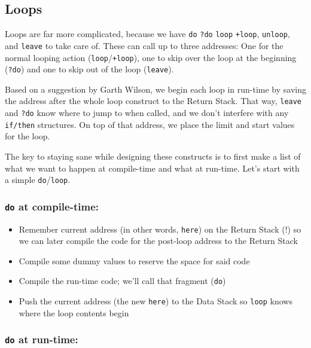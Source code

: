 \begin{enumerate}
{{\subsection{Loops} 

Loops are far more complicated, because we have \texttt{do} \texttt{?do}
\texttt{loop} \texttt{+loop}, \texttt{unloop}, and \texttt{leave} to take care
of. These can call up to three addresses: One for the normal looping action
(\texttt{loop}/\texttt{+loop}), one to skip over the loop at the beginning
(\texttt{?do}) and one to skip out of the loop (\texttt{leave}). 

Based on a suggestion by Garth Wilson, we begin each loop in run-time by saving
the address after the whole loop construct to the Return Stack. That way,
\texttt{leave} and \texttt{?do} know where to jump to when called, and we don't
interfere with any \texttt{if/then} structures. On top of that address, we place
the limit and start values for the loop. 

The key to staying sane while designing these constructs is to first make
a list of what we want to happen at compile-time and what at run-time. Let's
start with a simple \texttt{do}/\texttt{loop}.

\subsubsection{\texttt{do} at compile-time:}

\begin{itemize}

        \item Remember current address (in other words, \texttt{here}) on the
                Return Stack (!) so we can later compile the code for the
                post-loop address to the Return Stack

        \item Compile some dummy values to reserve the space for said code

        \item Compile the run-time code; we'll call that fragment (\texttt{do})

        \item Push the current address (the new \texttt{here}) to the Data Stack
                so \texttt{loop} knows where the loop contents begin

\end{itemize}

\subsubsection{\texttt{do} at run-time:}

}}
\end{enumerate}
